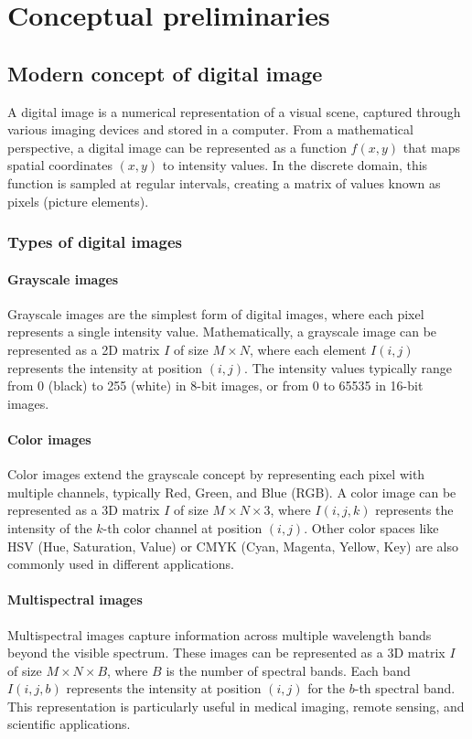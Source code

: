 \chapter{Conceptual preliminaries}\label{cap:conceptual_preliminaries}

\section{Modern concept of digital image}

A digital image is a numerical representation of a visual scene,
captured through various imaging devices and stored in a computer.
From a mathematical perspective, a digital image can be represented
as a function $f(x,y)$ that maps spatial coordinates $(x,y)$ to
intensity values. In the discrete domain, this function is sampled at
regular intervals, creating a matrix of values known as pixels
(picture elements).

\subsection{Types of digital images}

\subsubsection{Grayscale images}
Grayscale images are the simplest form of digital images, where each
pixel represents a single intensity value. Mathematically, a
grayscale image can be represented as a 2D matrix $I$ of size $M
\times N$, where each element $I(i,j)$ represents the intensity at
position $(i,j)$. The intensity values typically range from 0 (black)
to 255 (white) in 8-bit images, or from 0 to 65535 in 16-bit images.

\subsubsection{Color images}
Color images extend the grayscale concept by representing each pixel
with multiple channels, typically Red, Green, and Blue (RGB). A color
image can be represented as a 3D matrix $I$ of size $M \times N
\times 3$, where $I(i,j,k)$ represents the intensity of the $k$-th
color channel at position $(i,j)$. Other color spaces like HSV (Hue,
Saturation, Value) or CMYK (Cyan, Magenta, Yellow, Key) are also
commonly used in different applications.

\subsubsection{Multispectral images}
Multispectral images capture information across multiple wavelength
bands beyond the visible spectrum. These images can be represented as
a 3D matrix $I$ of size $M \times N \times B$, where $B$ is the
number of spectral bands. Each band $I(i,j,b)$ represents the
intensity at position $(i,j)$ for the $b$-th spectral band. This
representation is particularly useful in medical imaging, remote
sensing, and scientific applications.

